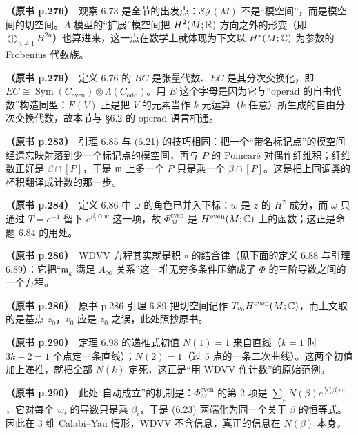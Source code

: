 \noindent \textbf{（原书 p.276）}\ 观察 6.73 是全节的出发点：$\mathcal{SJ}(M)$ 不是“模空间”，而是模空间的切空间。$A$ 模型的“扩展”模空间把 $H^2(M;\mathbb{R})$ 方向之外的形变（即 $\bigoplus_{n\ne1}H^{2n}$）也算进来，这一点在数学上就体现为下文以 $H^*(M;\mathbb{C})$ 为参数的 Frobenius 代数族。\par\smallskip

\noindent \textbf{（原书 p.279）}\ 定义 6.76 的 $BC$ 是张量代数、$EC$ 是其分次交换化，即 $EC\cong\operatorname{Sym}(C_{\mathrm{even}})\otimes\Lambda(C_{\mathrm{odd}})$。用 $E$ 这个字母是因为它与“operad 的自由代数”构造同型：$E(V)$ 正是把 $V$ 的元素当作 $k$ 元运算（$k$ 任意）所生成的自由分次交换代数，故本节与 §6.2 的 operad 语言相通。\par\smallskip

\noindent \textbf{（原书 p.283）}\ 引理 6.85 与 (6.21) 的技巧相同：把一个“带名标记点”的模空间经遗忘映射落到少一个标记点的模空间，再与 $P$ 的 Poincaré 对偶作纤维积；纤维数正好是 $\beta\cap[P]$，于是 $\mathfrak{m}$ 上多一个 $P$ 只是乘一个 $\beta\cap[P]$。这是把上同调类的杯积翻译成计数的那一步。\par\smallskip

\noindent \textbf{（原书 p.284）}\ 定义 6.86 中 $\omega$ 的角色已并入下标：$w$ 是 $z$ 的 $H^2$ 成分，而 $\tilde\omega$ 只通过 $T=e^{-1}$ 留下 $e^{\beta_i\cap w}$ 这一项，故 $\Phi_M^{\mathrm{even}}$ 是 $H^{\mathrm{even}}(M;\mathbb{C})$ 上的函数；这正是命题 6.84 的用处。\par\smallskip

\noindent \textbf{（原书 p.286）}\ WDVV 方程其实就是积 $\circ$ 的结合律（见下面的定义 6.88 与引理 6.89）：它把“$\mathfrak{m}_k$ 满足 $A_\infty$ 关系”这一堆无穷多条件压缩成了 $\Phi$ 的三阶导数之间的一个方程。\par\smallskip

\noindent \textbf{（原书 p.286）}\ 原书 p.286 引理 6.89 把切空间记作 $T_{v_0}H^{\mathrm{even}}(M;\mathbb{C})$，而上文取的是基点 $z_0$，$v_0$ 应是 $z_0$ 之误，此处照抄原书。\par\smallskip

\noindent \textbf{（原书 p.290）}\ 定理 6.98 的递推式初值 $N(1)=1$ 来自直线（$k=1$ 时 $3k-2=1$ 个点定一条直线）；$N(2)=1$（过 5 点的一条二次曲线）。这两个初值加上递推，就把全部 $N(k)$ 定死，这正是“用 WDVV 作计数”的原始范例。\par\smallskip

\noindent \textbf{（原书 p.290）}\ 此处“自动成立”的机制是：$\Phi_M^{\mathrm{even}}$ 的第 2 项是 $\sum_\beta N(\beta)e^{\sum\beta_iw_i}$，它对每个 $w_i$ 的导数只是乘 $\beta_i$，于是 (6.23) 两端化为同一个关于 $\beta$ 的恒等式。因此在 3 维 Calabi–Yau 情形，WDVV 不含信息，真正的信息在 $N(\beta)$ 本身。\par\smallskip

